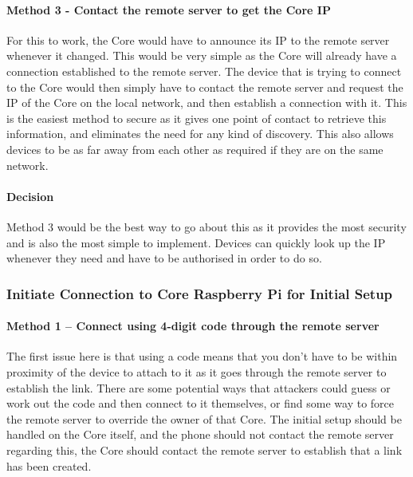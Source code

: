 \paragraph*{Method 3 - Contact the remote server to get the Core IP} For this to work, the Core would have to announce its IP to the remote server whenever it changed. This would be very simple as the Core will already have a connection established to the remote server. The device that is trying to connect to the Core would then simply have to contact the remote server and request the IP of the Core on the local network, and then establish a connection with it. This is the easiest method to secure as it gives one point of contact to retrieve this information, and eliminates the need for any kind of discovery. This also allows devices to be as far away from each other as required if they are on the same network.

\paragraph*{Decision}
Method 3 would be the best way to go about this as it provides the most security and is also the most simple to implement. Devices can quickly look up the IP whenever they need and have to be authorised in order to do so.

\subsubsection*{Initiate Connection to Core Raspberry Pi for Initial Setup}

\paragraph*{Method 1 – Connect using 4-digit code through the remote server}
The first issue here is that using a code means that you don’t have to be within proximity of the device to attach to it as it goes through the remote server to establish the link. There are some potential ways that attackers could guess or work out the code and then connect to it themselves, or find some way to force the remote server to override the owner of that Core. The initial setup should be handled on the Core itself, and the phone should not contact the remote server regarding this, the Core should contact the remote server to establish that a link has been created.

